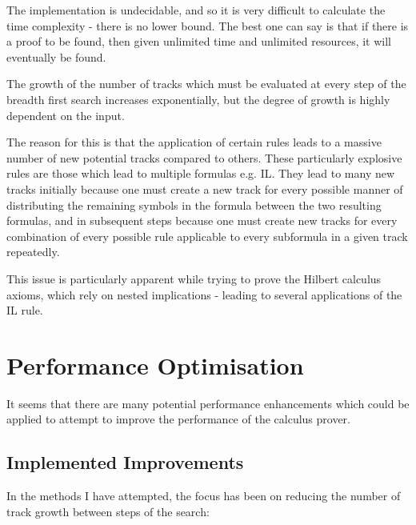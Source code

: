 \documentclass{article}
\begin{document}
The implementation is undecidable, and so it is very difficult to calculate the
time complexity - there is no lower bound. The best one
can say is that if there is a proof to be found, then given unlimited time and
unlimited resources, it will eventually be found.

The growth of the number of tracks which must be evaluated at every step of the 
breadth first search increases exponentially, but the degree of growth is highly 
dependent on the input. 

The reason for this is that the application of certain rules leads to a massive
number of new potential tracks compared to others. These particularly explosive
rules are those which lead to multiple formulas e.g. IL. They lead to many new
tracks initially because one must create a new track for every possible manner
of distributing the remaining symbols in the formula between the two resulting
formulas, and in subsequent steps because one must create new tracks for every
combination of every possible rule applicable to every subformula in a given
track repeatedly.

This issue is particularly apparent while trying to prove the Hilbert calculus
axioms, which rely on nested implications - leading to several applications of
the IL rule.

\section{Performance Optimisation}

It seems that there are many potential performance enhancements which could be
applied to attempt to improve the performance of the calculus prover. 

\subsection{Implemented Improvements}

In the
methods I have attempted, the focus has been on reducing the number of track
growth between steps of the search:
\end{document}
